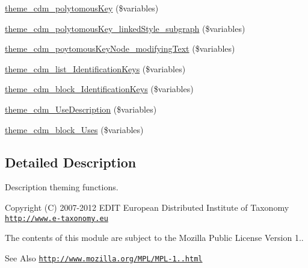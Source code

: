 \begin{DoxyCompactItemize}
\hyperlink{cdm__dataportal_8descriptions_8theme_a72232effb6bb436b31a640ed32a6db53}{theme\-\_\-cdm\-\_\-polytomous\-Key} (\$variables)
\item 
\hyperlink{cdm__dataportal_8descriptions_8theme_afeaf26517b09936d07f48e64a6c39a29}{theme\-\_\-cdm\-\_\-polytomous\-Key\-\_\-linked\-Style\-\_\-subgraph} (\$variables)
\item 
\hyperlink{cdm__dataportal_8descriptions_8theme_a65e00ab6289b9ea45957108aaf67e220}{theme\-\_\-cdm\-\_\-poytomous\-Key\-Node\-\_\-modifying\-Text} (\$variables)
\item 
\hyperlink{cdm__dataportal_8descriptions_8theme_a0895c48e94c39e9d2d2b225983ca54ca}{theme\-\_\-cdm\-\_\-list\-\_\-\-Identification\-Keys} (\$variables)
\item 
\hyperlink{cdm__dataportal_8descriptions_8theme_a41b831811cde915e203f46cf1ce8b78b}{theme\-\_\-cdm\-\_\-block\-\_\-\-Identification\-Keys} (\$variables)
\item 
\hyperlink{cdm__dataportal_8descriptions_8theme_a31b57657dc350d779a4120ae990417de}{theme\-\_\-cdm\-\_\-\-Use\-Description} (\$variables)
\item 
\hyperlink{cdm__dataportal_8descriptions_8theme_ada5d580faa5cca625c83e7644380271c}{theme\-\_\-cdm\-\_\-block\-\_\-\-Uses} (\$variables)
\end{DoxyCompactItemize}


\subsection{Detailed Description}
Description theming functions.

\begin{DoxyCopyright}{Copyright}
(C) 2007-\/2012 E\-D\-I\-T European Distributed Institute of Taxonomy \href{http://www.e-taxonomy.eu}{\tt http\-://www.\-e-\/taxonomy.\-eu}
\end{DoxyCopyright}
The contents of this module are subject to the Mozilla Public License Version 1.. \begin{DoxySeeAlso}{See Also}
\href{http://www.mozilla.org/MPL/MPL-1.1.html}{\tt http\-://www.\-mozilla.\-org/\-M\-P\-L/\-M\-P\-L-\/1..\-html} 
\end{DoxySeeAlso}


